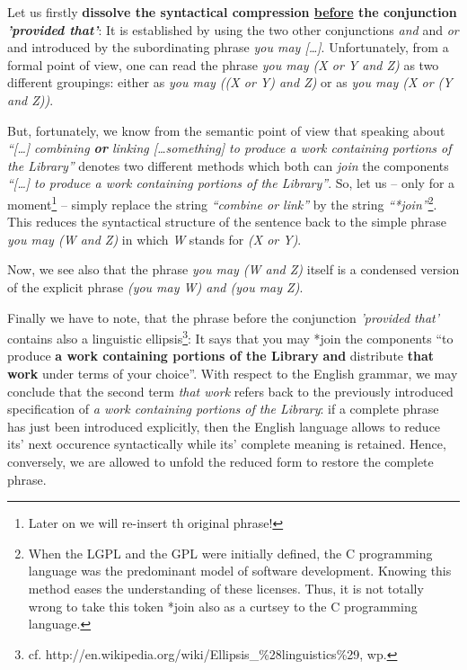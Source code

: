 Let us firstly \textbf{dissolve the syntactical compression \underline{before}
the conjunction \emph{'provided that'}}: It is established by using the two
other conjunctions \emph{and} and \emph{or} and introduced by the subordinating
phrase \emph{you may [\ldots]}. Unfortunately, from a formal point of view, one
can read the phrase \emph{you may (X or Y and Z)} as two different groupings:
either as \emph{you may ((X or Y) and Z)} or as \emph{you may (X or (Y and Z))}.

But, fortunately, we know from the semantic point of view that speaking about
\emph{\enquote{[\ldots] combining \textbf{or} linking [\ldots something] to
produce a work containing portions of the Library}} denotes two different
methods which both can \emph{join} the components \emph{\enquote{[\ldots] to
produce a work containing portions of the Library}}. So, let us -- only for a
moment\footnote{Later on we will re-insert th original phrase!} -- simply
replace the string \emph{\enquote{combine or link}} by the string
\emph{\enquote{*join}}\footnote{When the LGPL and the GPL were initially
defined, the C programming language was the predominant model of software
development. Knowing this method eases the understanding of these licenses.
Thus, it is not totally wrong to take this token *join also as a curtsey to the
C programming language.}. This reduces the syntactical structure of the sentence
back to the simple phrase \emph{you may (W and Z)} in which \emph{W} stands for
\emph{(X or Y)}.

Now, we see also that the phrase \emph{you may (W and Z)} itself is a
condensed version of the explicit phrase \emph{ (you may W) and (you may Z)}.

Finally we have to note, that the phrase before the conjunction \emph{'provided
that'} contains also a linguistic ellipsis\footnote{cf.
http://en.wikipedia.org/wiki/Ellipsis\_\%28linguistics\%29, wp.
}: It says that you may *join the components \enquote{to produce \textbf{a work
containing portions of the Library} \textbf{and} distribute \textbf{that work}
under terms of your choice}. With respect to the English grammar, we may
conclude that the second term \emph{that work} refers back to the previously
introduced specification of \emph{a work containing portions of the Library}: if
a complete phrase has just been introduced explicitly, then the English language
allows to reduce its' next occurence syntactically while its' complete meaning
is retained. Hence, conversely, we are allowed to unfold the reduced form to
restore the complete phrase.

